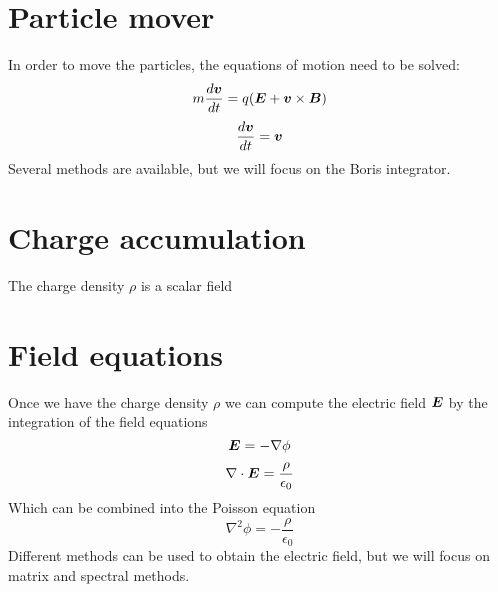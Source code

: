 \section{Particle mover}

In order to move the particles, the equations of motion need to be solved:
%
\begin{equation}
m \frac{d\bm{v}}{dt} = q (\bm{E} + \bm{v} \times \bm{B})
\end{equation}
\begin{equation}
\frac{d\bm{v}}{dt}=\bm{v}
\end{equation}
%
Several methods are available, but we will focus on the Boris integrator.

\section{Charge accumulation}

The charge density $\rho$ is a scalar field

\section{Field equations}

Once we have the charge density $\rho$ we can compute the electric field $\bm{E}$ by 
the integration of the field equations
%
\begin{equation}
\bm{E} = -\nabla \phi
\end{equation}
\begin{equation}
\nabla \cdot \bm{E} = \frac{\rho}{\epsilon_0}
\end{equation}
%
Which can be combined into the Poisson equation
%
\begin{equation}
\label{eq:poisson}
\nabla^2\phi = - \frac{\rho}{\epsilon_0}
\end{equation}
%
Different methods can be used to obtain the electric field, but we will focus on 
matrix and spectral methods.

